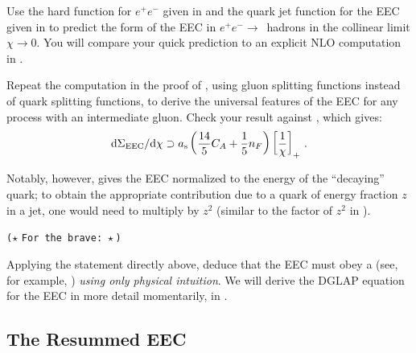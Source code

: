 \begin{exercise}
    Use the hard function for \(e^+e^-\) given in  and the quark jet function for the EEC given in  to predict the form of the EEC in \(e^+ e^- \to\,\) hadrons in the collinear limit \(\chi \to 0\).
    You will compare your quick prediction to an explicit NLO computation in .
\end{exercise}



\begin{exercise}
    Repeat the computation in the proof of , using gluon splitting functions instead of quark splitting functions, to derive the universal features of the EEC for any process with an intermediate gluon.
    Check your result against , which gives:
    \begin{align}
        \dd\Sigma_\text{EEC} / \dd \chi
        \supset
        a_{\mathrm{s}} \left(\frac{14}{5}C_A + \frac{1}{5} n_F \right)
        \left[\frac{1}{\chi}\right]_+
        \,.
    \end{align}
\end{exercise}


Notably, however,  gives the EEC normalized to the energy of the ``decaying'' quark;
%
to obtain the appropriate contribution due to a quark of energy fraction \(z\) in a jet, one would need to multiply by \(z^2\) (similar to the factor of \(z^2\) in ).

\begin{exercise}
    \texttt{(\(\star\,\,\)For the brave:\(\,\,\star\))}

    Applying the statement directly above, deduce that the EEC must obey a  (see, for example, ) \textit{using only physical intuition}.
    We will derive the DGLAP equation for the EEC in more detail momentarily, in .
\end{exercise}






\subsection{The Resummed EEC}
\label{sec:eec-resummed}

